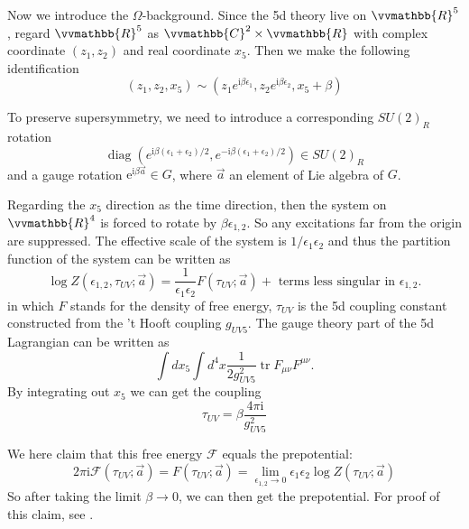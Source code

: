 \documentclass{article}
\begin{document}
Now we introduce the $\Omega$-background. Since the 5d theory live on $\vvmathbb{R}^5$, regard $\vvmathbb{R}^5$ as $\vvmathbb{C}^2\times\vvmathbb{R}$ with complex coordinate $(z_1,z_2)$ and real coordinate $x_5$. Then we make the following identification
\begin{equation}
\left(z_{1}, z_{2}, x_{5}\right) \sim\left(z_{1} e^{\mathrm{i} \beta \epsilon_{1}}, z_{2} e^{\mathrm{i} \beta \epsilon_{2}}, x_{5}+\beta\right)
\end{equation}

To preserve supersymmetry, we need to introduce a corresponding $SU(2)_R$ rotation
\begin{equation}
\operatorname{diag}\left(e^{\mathrm{i} \beta\left(\epsilon_{1}+\epsilon_{2}\right) / 2}, e^{-\mathrm{i} \beta\left(\epsilon_{1}+\epsilon_{2}\right) / 2}\right) \in SU(2)_{R}
\end{equation}
and a gauge rotation $\mathrm{e}^{\mathrm{i}\beta \vec{a}}\in G$, where $\vec{a}$ an element of Lie algebra of $G$.

Regarding the $x_5$ direction as the time direction, then the system on $\vvmathbb{R}^4$ is forced to rotate by $\beta\epsilon_{1,2}$. So any excitations far from the origin are suppressed. The effective scale of the system is $1/\epsilon_1\epsilon_2$ and thus the partition function of the system can be written as 
\begin{equation}
\log Z\left(\epsilon_{1,2}, \tau_{U V} ; \vec{a}\right)=\frac{1}{\epsilon_{1} \epsilon_{2}} F\left(\tau_{U V} ; \vec{a}\right)+\text { terms less singular in } \epsilon_{1,2} .
\end{equation}
in which $F$ stands for the density of free energy, $\tau_{UV}$ is the 5d coupling constant constructed from the 't Hooft coupling $g_{UV5}$. The gauge theory part of the 5d Lagrangian can be written as
\begin{equation}
\int d x_{5} \int d^{4} x \frac{1}{2 g_{U V 5}^{2}} \operatorname{tr} F_{\mu \nu} F^{\mu \nu}.
\end{equation}
By integrating out $x_5$ we can get the coupling
\begin{equation}
    \tau_{UV}=\beta\frac{4\pi\mathrm{i}}{g_{U V 5}^{2}}
\end{equation}

We here claim that this free energy $\mathcal{F}$ equals the prepotential:
\begin{equation}
\label{eq:prepcount}
    2 \pi \mathrm{i} \mathscr{F}\left(\tau_{U V} ; \vec{a}\right)=F\left(\tau_{U V} ; \vec{a}\right)=\lim _{\epsilon_{1,2} \rightarrow 0} \epsilon_{1} \epsilon_{2} \log Z\left(\tau_{U V} ; \vec{a}\right)
\end{equation}
So after taking the limit $\beta \rightarrow 0$, we can then get the prepotential. For proof of this claim, see \cite{Nekrasov:2002qd}.
\end{document}
